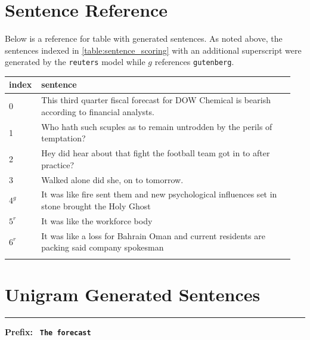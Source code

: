 \documentclass[11pt,a4paper]{article}
\begin{document}



\appendix
  \label{appendix}

\section{Sentence Reference}%
\label{sec:sentence_ref}

Below is a reference for table with generated sentences. As noted above, the sentences indexed in \ref{table:sentence_scoring} with an additional superscript were generated by the \texttt{reuters} model while $g$ references \texttt{gutenberg}.

\vspace{4mm}
\begin{tabular}{p{0.1\linewidth}|p{0.85\linewidth}}
\hline
   index & sentence                                                                                        \\
\hline
       0 & This third quarter fiscal forecast for DOW Chemical is bearish according to financial analysts. \\
       1 & Who hath such scuples as to remain untrodden by the perils of temptation?                       \\
       2 & Hey did hear about that fight the football team got in to after practice?                       \\
       3 & Walked alone did she, on to tomorrow.                                                           \\
       $4^g$ & It was like fire sent them and new psychological influences set in stone brought the Holy Ghost \\
       $5^r$ & It was like the workforce body                                                                  \\
       $6^r$ & It was like a loss for Bahrain Oman and current residents are packing said company spokesman    \\
\hline
\label{table:sentence_reference}
\end{tabular}


\section{Unigram Generated Sentences}
\label{sec:unigram_generated_sentences}


\rule{0.49\textwidth}{0.4pt}
\label{forecast_ex_unigram}
\textbf{Prefix:} \texttt{ \textbf{The forecast} }
\vspace{1mm}
\end{document}
